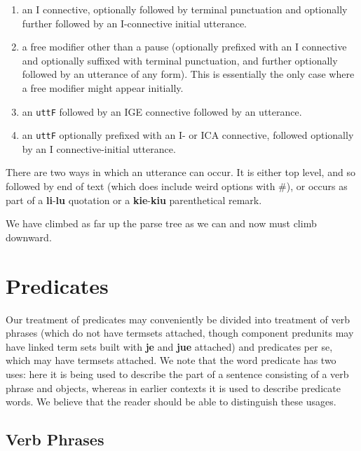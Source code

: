 \documentclass[12pt]{book}
\begin{document}
\begin{enumerate}

\item  an I connective, optionally followed by terminal punctuation and optionally further followed by an I-connective initial utterance.

\item  a free modifier other than a pause (optionally prefixed with an I connective and optionally suffixed with terminal punctuation, and further optionally followed by an utterance of any form).   This is essentially the only case where a free modifier might appear initially.

\item  an {\tt uttF} followed by an IGE connective followed by an utterance.

\item  an {\tt uttF} optionally prefixed with an I- or ICA connective, followed optionally by an I connective-initial utterance.

\end{enumerate}

There are two ways in which an utterance can occur.  It is either top level, and so followed by end of text (which does include weird options with \#), or occurs as part of a {\bf li}-{\bf lu} quotation or a {\bf kie}-{\bf kiu} parenthetical remark.

We have climbed as far up the parse tree as we can and now must climb downward.

\newpage

\section{Predicates}

Our treatment of predicates may conveniently be divided into treatment of verb phrases (which do not have termsets attached, though component predunits may have linked term sets built with {\bf je} and {\bf jue} attached) and predicates per se, which may have termsets attached.  We note that the word predicate has two uses:  here it is being used to describe the part of a sentence consisting of a verb phrase and objects, whereas in earlier contexts it is used to describe predicate words.  We believe that the reader should be able to distinguish these usages.

\subsection{Verb Phrases}
\end{document}
